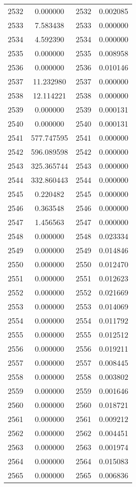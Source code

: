 \documentclass[12pt]{article}
\begin{document}
\begin{longtable}{@{}cccc@{}}
2532 & 0.000000 & 2532 & 0.002085 \\
2533 & 7.583438 & 2533 & 0.000000 \\
2534 & 4.592390 & 2534 & 0.000000 \\
2535 & 0.000000 & 2535 & 0.008958 \\
2536 & 0.000000 & 2536 & 0.010146 \\
2537 & 11.232980 & 2537 & 0.000000 \\
2538 & 12.114221 & 2538 & 0.000000 \\
2539 & 0.000000 & 2539 & 0.000131 \\
2540 & 0.000000 & 2540 & 0.000131 \\
2541 & 577.747595 & 2541 & 0.000000 \\
2542 & 596.089598 & 2542 & 0.000000 \\
2543 & 325.365744 & 2543 & 0.000000 \\
2544 & 332.860443 & 2544 & 0.000000 \\
2545 & 0.220482 & 2545 & 0.000000 \\
2546 & 0.363548 & 2546 & 0.000000 \\
2547 & 1.456563 & 2547 & 0.000000 \\
2548 & 0.000000 & 2548 & 0.023334 \\
2549 & 0.000000 & 2549 & 0.014846 \\
2550 & 0.000000 & 2550 & 0.012470 \\
2551 & 0.000000 & 2551 & 0.012623 \\
2552 & 0.000000 & 2552 & 0.021669 \\
2553 & 0.000000 & 2553 & 0.014069 \\
2554 & 0.000000 & 2554 & 0.011792 \\
2555 & 0.000000 & 2555 & 0.012512 \\
2556 & 0.000000 & 2556 & 0.019211 \\
2557 & 0.000000 & 2557 & 0.008445 \\
2558 & 0.000000 & 2558 & 0.003802 \\
2559 & 0.000000 & 2559 & 0.001646 \\
2560 & 0.000000 & 2560 & 0.018721 \\
2561 & 0.000000 & 2561 & 0.009212 \\
2562 & 0.000000 & 2562 & 0.004451 \\
2563 & 0.000000 & 2563 & 0.001974 \\
2564 & 0.000000 & 2564 & 0.015083 \\
2565 & 0.000000 & 2565 & 0.006836 \\

\end{longtable}
\end{document}
